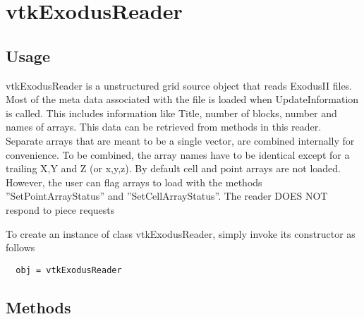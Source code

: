 \section{vtkExodusReader}

\subsection{Usage}

 vtkExodusReader is a unstructured grid source object that reads ExodusII
 files.  Most of the meta data associated with the file is loaded when 
 UpdateInformation is called.  This includes information like Title, number
 of blocks, number and names of arrays. This data can be retrieved from 
 methods in this reader. Separate arrays that are meant to be a single 
 vector, are combined internally for convenience.  To be combined, the array 
 names have to be identical except for a trailing X,Y and Z (or x,y,z).  By 
 default cell and point arrays are not loaded.  However, the user can flag 
 arrays to load with the methods ''SetPointArrayStatus'' and
 ''SetCellArrayStatus''.  The reader DOES NOT respond to piece requests
 

To create an instance of class vtkExodusReader, simply
invoke its constructor as follows
\begin{verbatim}
  obj = vtkExodusReader
\end{verbatim}
\subsection{Methods}

